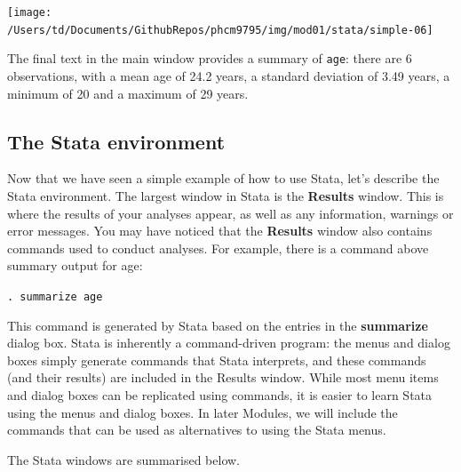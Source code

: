 \documentclass[
]{memoir}
\begin{document}
\texttt{[image: /Users/td/Documents/GithubRepos/phcm9795/img/mod01/stata/simple-06]}

The final text in the main window provides a summary of \texttt{age}: there are 6 observations, with a mean age of 24.2 years, a standard deviation of 3.49 years, a minimum of 20 and a maximum of 29 years.

\hypertarget{the-stata-environment}{%
\subsection{The Stata environment}\label{the-stata-environment}}

Now that we have seen a simple example of how to use Stata, let's describe the Stata environment. The largest window in Stata is the \textbf{Results} window. This is where the results of your analyses appear, as well as any information, warnings or error messages. You may have noticed that the \textbf{Results} window also contains commands used to conduct analyses. For example, there is a command above summary output for age:

\texttt{.\ summarize\ age}

This command is generated by Stata based on the entries in the \textbf{summarize} dialog box. Stata is inherently a command-driven program: the menus and dialog boxes simply generate commands that Stata interprets, and these commands (and their results) are included in the Results window. While most menu items and dialog boxes can be replicated using commands, it is easier to learn Stata using the menus and dialog boxes. In later Modules, we will include the commands that can be used as alternatives to using the Stata menus.

The Stata windows are summarised below.
\end{document}
